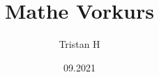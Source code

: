 \documentclass[12pt]{article}
\begin{document}
\title{Mathe Vorkurs}
\author{Tristan H}
\date{09.2021}
\maketitle

\tableofcontents
\newpage










\end{document}
